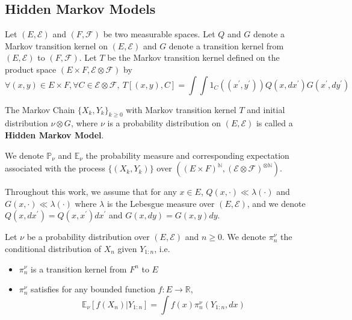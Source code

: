 \subsection{Hidden Markov Models}
\begin{definition}
Let $(E, \mathcal E)$ and $(F, \mathcal F)$ be two measurable spaces. Let $Q$ and $G$ denote a Markov transition kernel on $(E, \mathcal E)$ and $G$ denote a transition kernel from $(E, \mathcal E)$ to $(F, \mathcal F)$. Let $T$ be the Markov transition kernel defined on the product space $(E \times F, \mathcal E \otimes \mathcal F)$ by
\begin{equation}
    \forall (x, y) \in E\times F, \forall C\in\mathcal E \otimes\mathcal F, ~T\left[(x, y), C\right] = \int \int 1_C((x^\prime, y^\prime)) Q(x, dx^\prime) G(x^\prime, dy^\prime)
\end{equation}

The Markov Chain $\lbrace X_k, Y_k \rbrace_{k\geq 0}$ with Markov transition kernel $T$ and initial distribution $\nu \otimes G$, where $\nu$ is a probability distribution on $(E, \mathcal E)$ is called a \textbf{Hidden Markov Model}.

We denote $\mathbb P_\nu$ and $\mathbb E_\nu$ the probability measure and corresponding expectation associated with the process $\lbrace (X_k, Y_k)\rbrace$ over $\left((E\times F)^{\mathbb N}, (\mathcal E \otimes \mathcal F)^{\otimes \mathbb N}\right)$.
\end{definition}

Throughout this work, we assume that for any $x\in E$, $Q(x, \cdot) \ll \lambda(\cdot)$ and $G(x, \cdot) \ll \lambda(\cdot)$ where $\lambda$ is the Lebesgue measure over $(E, \mathcal E)$, and we denote $Q(x, dx^\prime) = Q(x, x^\prime)dx^\prime$ and $G(x, dy)= G(x, y)dy$.


\begin{definition}
Let $\nu$ be a probability distribution over $(E, \mathcal E)$ and $n \geq 0$. We denote $\pi_n^\nu$ the conditional distribution of $X_n$ given $Y_{1:n}$, i.e.
\begin{itemize}
    \item $\pi_n^\nu$ is a transition kernel from $F^n$ to $E$
    \item $\pi_n^\nu$ satisfies for any bounded function $f: E \to \mathbb R$,
    \begin{equation}
        \mathbb E_\nu \left[ f(X_n) \vert Y_{1:n}\right] = \int f(x)\pi^\nu_n(Y_{1:n}, dx)
    \end{equation}
\end{itemize}
\end{definition}

